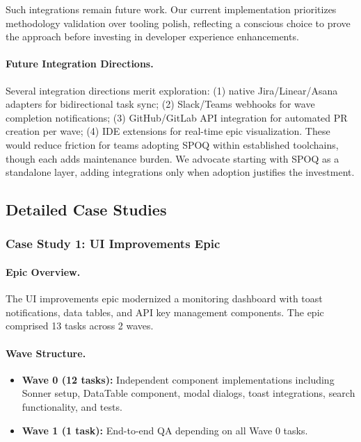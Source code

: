 Such integrations remain future work. Our current implementation
prioritizes methodology validation over tooling polish, reflecting
a conscious choice to prove the approach before investing in
developer experience enhancements.

\paragraph{Future Integration Directions.}
Several integration directions merit exploration:
(1) native Jira/Linear/Asana adapters for bidirectional task sync;
(2) Slack/Teams webhooks for wave completion notifications;
(3) GitHub/GitLab API integration for automated PR creation per wave;
(4) IDE extensions for real-time epic visualization.
These would reduce friction for teams adopting SPOQ within established
toolchains, though each adds maintenance burden. We advocate starting
with SPOQ as a standalone layer, adding integrations only when
adoption justifies the investment.

\subsection{Detailed Case Studies}
\label{subsec:case-study-detail}

\subsubsection{Case Study 1: UI Improvements Epic}
\label{subsubsec:ui-epic-detail}

\paragraph{Epic Overview.}
The UI improvements epic modernized a monitoring dashboard with toast
notifications, data tables, and API key management components. The
epic comprised 13 tasks across 2 waves.

\paragraph{Wave Structure.}
\begin{itemize}
    \item \textbf{Wave 0 (12 tasks):} Independent component implementations
    including Sonner setup, DataTable component, modal dialogs, toast
    integrations, search functionality, and tests.
    \item \textbf{Wave 1 (1 task):} End-to-end QA depending on all Wave 0 tasks.
\end{itemize}

